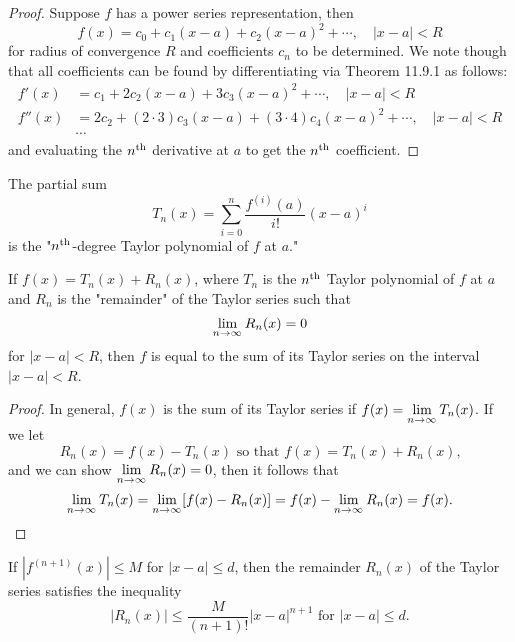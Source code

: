 \documentclass[a4paper,8pt]{article}
\begin{document}
\begin{outline}
    \begin{proof}
      Suppose \(f\) has a power series representation, then
      \[ f(x) = c_0 + c_1(x-a) + c_2(x-a)^2 + \cdots,\quad |x-a| < R \]
      for radius of convergence \(R\) and coefficients \(c_n\) to be determined.
      We note though that all coefficients can be found by differentiating via Theorem 11.9.1 as follows:
      \begin{align*}
        f'(x) &= c_1 + 2c_2(x-a) + 3c_3(x-a)^2 + \cdots,\quad |x-a| < R \\
        f''(x) &= 2c_2 + (2\cdot 3)c_3(x-a) + (3\cdot 4)c_4(x-a)^2 + \cdots,\quad |x-a| < R \\
              &\cdots
      \end{align*}
      and evaluating the \(n\textsuperscript{th}\) derivative at \(a\) to get the \(n\textsuperscript{th}\) coefficient.
    \end{proof}

    The partial sum \[T_n(x) = \sum_{i=0}^{n}\frac{f^{(i)}(a)}{i!}(x-a)^i\] is the "\(n\textsuperscript{th}\)-degree Taylor polynomial of \(f\) at \(a\)."

    If \(f(x) = T_n(x) + R_n(x)\), where \(T_n\) is the \(n\textsuperscript{th}\) Taylor polynomial of \(f\) at \(a\) and \(R_n\) is the "remainder"
    of the Taylor series such that \[\lim\limits_{n\rightarrow \infty^{}}R_n(x) = 0\] for \(|x-a| < R\), then \(f\) is equal to the sum of its Taylor series on the
    interval \(|x-a| < R\).

    \begin{proof}
      In general, \(f(x)\) is the sum of its Taylor series if \(f(x) = \lim\limits_{n\rightarrow \infty^{}}T_n(x)\). If we let
      \[ R_n(x) = f(x) - T_n(x)\text{ so that }f(x) = T_n(x) + R_n(x)\text{,} \] and we can show \(\lim\limits_{n\rightarrow \infty^{}} R_n(x) = 0\),
      then it follows that \[ \lim\limits_{n\rightarrow \infty^{}}T_n(x) = \lim\limits_{n\rightarrow \infty^{}}[f(x) - R_n(x)] = f(x) - \lim\limits_{n\rightarrow \infty^{}}R_n(x) = f(x)\text{.} \]
    \end{proof}

  \pagebreak
    If \(|f^{(n+1)}(x)| \leq M\) for \(|x-a| \leq d\), then the remainder \(R_n(x)\) of the Taylor series satisfies the inequality
    \[ |R_n(x)| \leq \frac{M}{(n+1)!}|x-a|^{n+1}\text{ for } |x-a| \leq d\text{.} \]


\end{outline}
\end{document}
